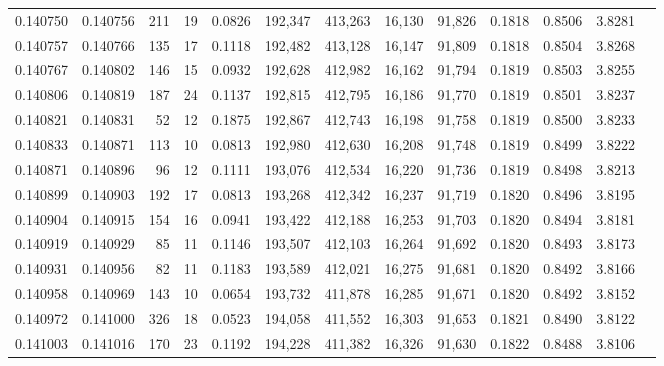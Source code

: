 \begin{tabular}{rrrrrrrrrrrrr}
0.140750 & 0.140756 &   211 &  19 &                                     0.0826 & 192,347 & 413,263 &  16,130 &  91,826 & 0.1818 & 0.8506 & 3.8281 \\
0.140757 & 0.140766 &   135 &  17 &                                     0.1118 & 192,482 & 413,128 &  16,147 &  91,809 & 0.1818 & 0.8504 & 3.8268 \\
0.140767 & 0.140802 &   146 &  15 &                                     0.0932 & 192,628 & 412,982 &  16,162 &  91,794 & 0.1819 & 0.8503 & 3.8255 \\
0.140806 & 0.140819 &   187 &  24 &                                     0.1137 & 192,815 & 412,795 &  16,186 &  91,770 & 0.1819 & 0.8501 & 3.8237 \\
0.140821 & 0.140831 &    52 &  12 &                                     0.1875 & 192,867 & 412,743 &  16,198 &  91,758 & 0.1819 & 0.8500 & 3.8233 \\
0.140833 & 0.140871 &   113 &  10 &                                     0.0813 & 192,980 & 412,630 &  16,208 &  91,748 & 0.1819 & 0.8499 & 3.8222 \\
0.140871 & 0.140896 &    96 &  12 &                                     0.1111 & 193,076 & 412,534 &  16,220 &  91,736 & 0.1819 & 0.8498 & 3.8213 \\
0.140899 & 0.140903 &   192 &  17 &                                     0.0813 & 193,268 & 412,342 &  16,237 &  91,719 & 0.1820 & 0.8496 & 3.8195 \\
0.140904 & 0.140915 &   154 &  16 &                                     0.0941 & 193,422 & 412,188 &  16,253 &  91,703 & 0.1820 & 0.8494 & 3.8181 \\
0.140919 & 0.140929 &    85 &  11 &                                     0.1146 & 193,507 & 412,103 &  16,264 &  91,692 & 0.1820 & 0.8493 & 3.8173 \\
0.140931 & 0.140956 &    82 &  11 &                                     0.1183 & 193,589 & 412,021 &  16,275 &  91,681 & 0.1820 & 0.8492 & 3.8166 \\
0.140958 & 0.140969 &   143 &  10 &                                     0.0654 & 193,732 & 411,878 &  16,285 &  91,671 & 0.1820 & 0.8492 & 3.8152 \\
0.140972 & 0.141000 &   326 &  18 &                                     0.0523 & 194,058 & 411,552 &  16,303 &  91,653 & 0.1821 & 0.8490 & 3.8122 \\
0.141003 & 0.141016 &   170 &  23 &                                     0.1192 & 194,228 & 411,382 &  16,326 &  91,630 & 0.1822 & 0.8488 & 3.8106 \\

\end{tabular}
